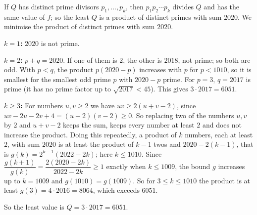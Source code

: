 If $Q$ has distinct prime divisors $p_1,\dots,p_k$, then $p_1p_2\cdots p_k$ divides $Q$ and has the same value of $f$; so the least $Q$ is a product of distinct primes with sum $2020$. We minimise the product of distinct primes with sum $2020$.

\textbf{$k=1$:} $2020$ is not prime.

\textbf{$k=2$:} $p+q=2020$. If one of them is $2$, the other is $2018$, not prime; so both are odd. With $p<q$, the product $p(2020-p)$ increases with $p$ for $p<1010$, so it is smallest for the smallest odd prime $p$ with $2020-p$ prime. For $p=3$, $q=2017$ is prime (it has no prime factor up to $\sqrt{2017}<45$). This gives $3\cdot2017=6051$.

\textbf{$k\ge3$:} For numbers $u,v\ge2$ we have $uv\ge2(u+v-2)$, since $uv-2u-2v+4=(u-2)(v-2)\ge0$. So replacing two of the numbers $u,v$ by $2$ and $u+v-2$ keeps the sum, keeps every number at least $2$ and does not increase the product. Doing this repeatedly, a product of $k$ numbers, each at least $2$, with sum $2020$ is at least the product of $k-1$ twos and $2020-2(k-1)$, that is $g(k)=2^{k-1}(2022-2k)$; here $k\le1010$. Since $\dfrac{g(k+1)}{g(k)}=\dfrac{2(2020-2k)}{2022-2k}\ge1$ exactly when $k\le1009$, the bound $g$ increases up to $k=1009$ and $g(1010)=g(1009)$. So for $3\le k\le1010$ the product is at least $g(3)=4\cdot2016=8064$, which exceeds $6051$.

So the least value is $Q=3\cdot2017=\boxed{6051}$.

